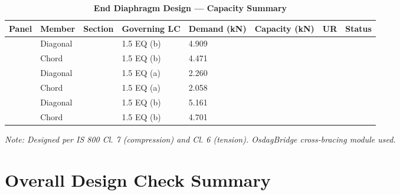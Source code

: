 \documentclass[12pt,a4paper]{report}
\numberwithin{table}{chapter}
\numberwithin{figure}{chapter}
\begin{document}
\vspace{1em}

\begin{longtable}{|C{2.0cm}|L{1.8cm}|C{2.2cm}|C{3.0cm}|C{1.8cm}|C{1.8cm}|C{1.2cm}|C{1.8cm}|}
\caption{\textbf{End Diaphragm Design --- Capacity Summary}}
\hline
\textbf{Panel} & \textbf{Member} & \textbf{Section} & \textbf{Governing LC} & \textbf{Demand (kN)} & \textbf{Capacity (kN)} & \textbf{UR} & \textbf{Status} \\[6pt]
\hline
{} & Diagonal &  & 1.5 EQ (b) & 4.909 &  &  &  \\[6pt]
 & Chord &  & 1.5 EQ (b) & 4.471 &  &  &  \\[6pt]
\hline
{} & Diagonal &  & 1.5 EQ (a) & 2.260 &  &  &  \\[6pt]
 & Chord &  & 1.5 EQ (a) & 2.058 &  &  &  \\[6pt]
\hline
{} & Diagonal &  & 1.5 EQ (b) & 5.161 &  &  &  \\[6pt]
 & Chord &  & 1.5 EQ (b) & 4.701 &  &  &  \\[6pt]
\hline
\end{longtable}
\noindent\textit{Note: Designed per IS 800 Cl. 7 (compression) and Cl. 6 (tension). OsdagBridge cross-bracing module used.}

\section{Overall Design Check Summary}
\label{sec:overall-summary}
\end{document}
